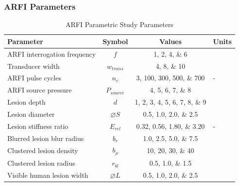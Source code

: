 \documentclass{beamer}
\begin{document}
		\begin{frame}
			\frametitle{ARFI Parameters}
			\centering
			\scriptsize

			\begin{table}
				\caption{ARFI Parametric Study Parameters}
				\begin{tabular}{lccs[table-unit-alignment = left]}
					\toprule
					Parameter & Symbol & Values & {Units} \\
					\midrule
					ARFI interrogation frequency & $f$ & \numlist{1;2;4;6} & \MHz \\
					Transducer width & $w_{trans}$ & \numlist{4;8;10} & \cm \\
					ARFI pulse cycles & $n_c$ & \numlist{3;100;300;500;700} & - \\
					ARFI source pressure & $P_{source}$ & \numlist{4;5;6;7;8} & \MPa \\
					Lesion depth & $d$ & \numlist{1;2;3;4;5;6;7;8;9} & \cm \\
					Lesion diameter & $\diameter S$ & \numlist{0.5;1.0;2.0;2.5} & \cm \\
					Lesion stiffness ratio & $E_{rel}$ & \numlist{0.32;0.56;1.80;3.20} & - \\
					Blurred lesion blur radius & $b_r$ & \numlist{1.0;2.5;5.0;7.5} & \mm \\
					Clustered lesion density & $b_\rho$ & \numlist{10;20;30;40} & \per\cm\squared \\
					Clustered lesion radius & $r_{bl}$ & \numlist{0.5;1.0;1.5} & \mm \\
					Visible human lesion width & $\diameter L$ & \numlist{0.5;1.0;2.0;2.5} & \cm \\
					\bottomrule
				\end{tabular}
			\end{table}
		\end{frame}
\end{document}
